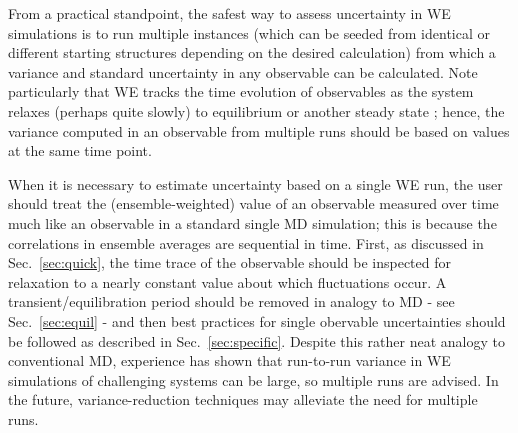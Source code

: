 From a practical standpoint, the safest way to assess uncertainty in WE simulations is to run multiple instances (which can be seeded from identical or different starting structures depending on the desired calculation) from which a variance and standard uncertainty in any observable can be calculated.
Note particularly that WE tracks the time evolution of observables as the system relaxes (perhaps quite slowly) to equilibrium or another steady state \cite{Zhang2010a}; hence, the variance computed in an observable from multiple runs should be based on values at the same time point.

When it is necessary to estimate uncertainty based on a single WE run, the user should treat the (ensemble-weighted) value of an observable measured over time much like an observable in a standard single MD simulation; this is because the correlations in ensemble averages are sequential in time.
First, as discussed in Sec.\ \ref{sec:quick}, the time trace of the observable should be inspected for relaxation to a nearly constant value about which fluctuations occur.
A transient/equilibration period should be removed in analogy to MD - see Sec.\ \ref{sec:equil} - and then best practices for single obervable uncertainties should be followed as described in Sec.\ \ref{sec:specific}.
Despite this rather neat analogy to conventional MD, experience has shown that run-to-run variance in WE simulations of challenging systems can be  large, so multiple runs are  advised.  In the future, variance-reduction techniques may alleviate the need for multiple runs.
